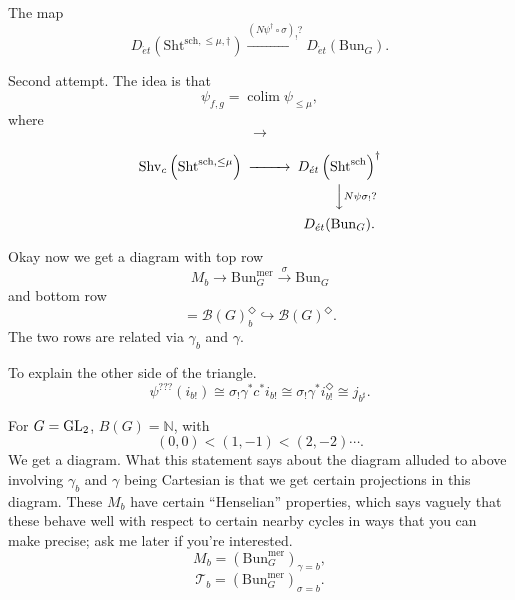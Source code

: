 \documentclass[reqno]{amsart} 
\begin{document}
\begin{corollary}
  The map
  \begin{equation*}
    D_{\acute{e}t} \left( \mathrm{Sht}^{\mathrm{sch}, \leq \mu, \dagger} \right)
    \xrightarrow{(N \psi^\dagger \circ \sigma )_!?}
    D_{\acute{e}t} \left( \mathrm{Bun}_G \right).
  \end{equation*}
\end{corollary}

Second attempt.  The idea is that
\begin{equation*}
  \psi_{f, g} = \operatorname{colim} \psi_{\leq \mu},
\end{equation*}
where
\begin{equation*}
  \rightarrow 
\end{equation*}

\begin{equation*}
  \begin{CD}         
    \mathrm{Shv}_c\left(\mathrm{Sht}^{\mathrm{sch}, \leq \mu}\right) @>>> D_{\acute{e}t}
    \left( \mathrm{Sht}^{\mathrm{sch}} \right)^\dagger\\
    @.  @VV N \psi \sigma_!?V \\
    @. D_{\acute{e}t}(\mathrm{Bun}_G).\\
  \end{CD}
\end{equation*}


Okay now we get a diagram with top row
\begin{equation*}
  M_b \rightarrow \mathrm{Bun}_G^{\mathrm{mer}} \xrightarrow{\sigma} \mathrm{Bun}_G
\end{equation*}
and bottom row
\begin{equation*}
  [\ast / G_b(\mathbb{Q}_p)] = \mathcal{B}(G)_b^{\Diamond} \hookrightarrow \mathcal{B}(G)^{\Diamond}. 
\end{equation*}
The two rows are related via $\gamma_b$ and $\gamma$.

To explain the other side of the triangle.
\begin{equation*}
  \psi^{???}(i_{b !}) \cong \sigma_{!} \gamma^\ast c^\ast i_{b !}
  \cong \sigma _! \gamma^\ast i_{b!}^{\Diamond}
  \cong j_{b^\sharp}.
\end{equation*}

For $G = \operatorname{GL}_2$, $B(G) = \mathbb{N}$, with
\begin{equation*}
  (0, 0) <(1, -1) <(2, -2) \dotsb.
\end{equation*}
We get a diagram.  What this statement says about the diagram alluded to above involving $\gamma_b$ and $\gamma$ being Cartesian is that we get certain projections in this diagram.  These $M_b$ have certain ``Henselian'' properties, which says vaguely that these behave well with respect to certain nearby cycles in ways that you can make precise; ask me later if you're interested.
\begin{equation*}
  M_b = \left( \mathrm{Bun}_G^{\mathrm{mer}} \right)_{\gamma = b},
\end{equation*}
\begin{equation*}
  \mathcal{T}_b = \left( \mathrm{Bun}_G^{\mathrm{mer}} \right)_{\sigma = b}.
\end{equation*}
\end{document}
